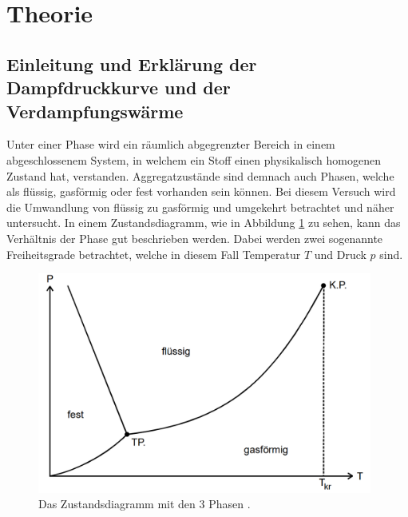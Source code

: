 \section{Theorie}

\subsection{Einleitung und Erklärung der Dampfdruckkurve und der Verdampfungswärme }

\begin{flushleft}
    Unter einer Phase wird ein räumlich abgegrenzter Bereich in einem abgeschlossenem System, in welchem ein Stoff einen physikalisch homogenen Zustand hat, verstanden.
    Aggregatzustände sind demnach auch Phasen, welche als flüssig, gasförmig oder fest vorhanden sein können.
    Bei diesem Versuch wird die Umwandlung von flüssig zu gasförmig und umgekehrt betrachtet und näher untersucht.
    In einem Zustandsdiagramm, wie in Abbildung \ref{Abbildung1} zu sehen, kann das Verhältnis der Phase gut beschrieben werden.
    Dabei werden zwei sogenannte Freiheitsgrade betrachtet, welche in diesem Fall Temperatur $T$ und Druck $p$ sind.
\end{flushleft}

\begin{figure}[H]  
    \centering
    \includegraphics[width=110mm]{bilder/Zustandsdiagramm.png}
    \caption{Das Zustandsdiagramm mit den 3 Phasen \cite{a1}. \label{Abbildung1} }
\end{figure}

